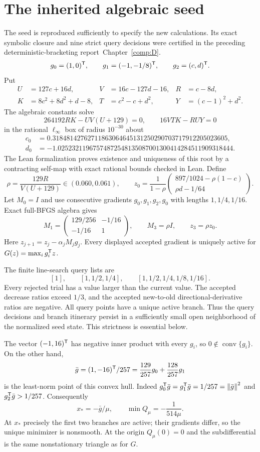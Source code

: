 \section{The inherited algebraic seed}
The seed is reproduced sufficiently to specify the new calculations. Its exact symbolic closure and nine strict query decisions were certified in the preceding deterministic-bracketing report~Chapter~\ref{comp:D}.
\[
 g_0=(1,0)^{\mathsf T},\qquad g_1=(-1,-1/8)^{\mathsf T},\qquad g_2=(c,d)^{\mathsf T}.
\]
Put
\begin{align*}
 U&=127c+16d,&V&=16c-127d-16,&R&=c-8d,\\
 K&=8c^2+8d^2+d-8,&T&=c^2-c+d^2,&Y&=(c-1)^2+d^2.
\end{align*}
The algebraic constants solve
\[
 264192RK-UV(U+129)=0,\qquad 16VTK-RUY=0
\]
in the rational $\ell_\infty$ box of radius $10^{-30}$ about
\begin{align*}
 c_0&=0.31848142762711863064645131250290703717912205023605,\\
 d_0&=-1.02523211967574872548135087001300414284511909318444.
\end{align*}
The Lean formalization proves existence and uniqueness of this root by a contracting self-map with exact rational bounds checked in Lean. Define
\[
 \rho=\frac{129R}{V(U+129)}\in(0.060,0.061),\qquad
 z_0=\frac1{1-\rho}
 \begin{pmatrix}897/1024-\rho(1-c)\\ \rho d-1/64\end{pmatrix}.
\]
Let $M_0=I$ and use consecutive gradients $g_0,g_1,g_2,g_0$ with lengths $1,1/4,1/16$. Exact full-BFGS algebra gives
\[
 M_1=\begin{pmatrix}129/256&-1/16\\-1/16&1\end{pmatrix},
 \qquad M_3=\rho I,\qquad z_3=\rho z_0.
\]
Here $z_{j+1}=z_j-\alpha_jM_jg_j$. Every displayed accepted gradient is uniquely active for $G(z)=\max_i g_i^{\mathsf T} z$.

The finite line-search query lists are
\[
 [1],\qquad[1,1/2,1/4],\qquad[1,1/2,1/4,1/8,1/16].
\]
Every rejected trial has a value larger than the current value. The accepted decrease ratios exceed $1/3$, and the accepted new-to-old directional-derivative ratios are negative. All query points have a unique active branch. Thus the query decisions and branch itinerary persist in a sufficiently small open neighborhood of the normalized seed state. This strictness is essential below.

The vector $(-1,16)^{\mathsf T}$ has negative inner product with every $g_i$, so $0\notin\operatorname{conv}\{g_i\}$. On the other hand,
\[
 \bar g=(1,-16)^{\mathsf T}/257
 =\frac{129}{257}g_0+\frac{128}{257}g_1
\]
is the least-norm point of this convex hull. Indeed $g_0^{\mathsf T}\bar g=g_1^{\mathsf T}\bar g=1/257=\left\lVert\bar g\right\rVert^2$ and $g_2^{\mathsf T}\bar g>1/257$. Consequently
\begin{equation}\label{L:eq:minimizer}
 x_*=-\bar g/\mu,\qquad \min Q_\mu=-\frac1{514\mu}.
\end{equation}
At $x_*$ precisely the first two branches are active; their gradients differ, so the unique minimizer is nonsmooth. At the origin $Q_\mu(0)=0$ and the subdifferential is the same nonstationary triangle as for $G$.


